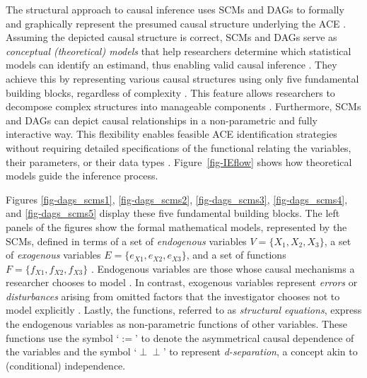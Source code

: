 \documentclass[
  authoryear,
  review,
  1p]{elsarticle}
\begin{document}
The structural approach to causal inference uses SCMs and DAGs to
formally and graphically represent the presumed causal structure
underlying the ACE
\citep{Pearl_2009, Pearl_et_al_2016, Gross_et_al_2018, Neal_2020}.
Assuming the depicted causal structure is correct, SCMs and DAGs serve
as \emph{conceptual (theoretical) models} that help researchers
determine which statistical models can identify an estimand, thus
enabling valid causal inference \citep{McElreath_2020}. They achieve
this by representing various causal structures using only five
fundamental building blocks, regardless of complexity
\citep{Neal_2020, McElreath_2020}. This feature allows researchers to
decompose complex structures into manageable components
\citep{McElreath_2020}. Furthermore, SCMs and DAGs can depict causal
relationships in a non-parametric and fully interactive way. This
flexibility enables feasible ACE identification strategies without
requiring detailed specifications of the functional relating the
variables, their parameters, or their data types
\citep{Pearl_et_al_2016}. Figure~\ref{fig-IEflow} shows how theoretical
models guide the inference process.

Figures \ref{fig-dags_scms1}, \ref{fig-dags_scms2},
\ref{fig-dags_scms3}, \ref{fig-dags_scms4}, and \ref{fig-dags_scms5}
display these five fundamental building blocks. The left panels of the
figures show the formal mathematical models, represented by the SCMs,
defined in terms of a set of \emph{endogenous} variables
\(V=\{X_{1},X_{2},X_{3}\}\), a set of \emph{exogenous} variables
\(E=\{e_{X1},e_{X2},e_{X3}\}\), and a set of functions
\(F=\{f_{X1},f_{X2},f_{X3}\}\) \citep{Pearl_2009, Cinelli_et_al_2020}.
Endogenous variables are those whose causal mechanisms a researcher
chooses to model \citep{Neal_2020}. In contrast, exogenous variables
represent \emph{errors} or \emph{disturbances} arising from omitted
factors that the investigator chooses not to model explicitly
\citep[pp.~27,68]{Pearl_2009}. Lastly, the functions, referred to as
\emph{structural equations}, express the endogenous variables as
non-parametric functions of other variables. These functions use the
symbol `\(:=\)' to denote the asymmetrical causal dependence of the
variables and the symbol `\(\perp\!\!\!\perp\)' to represent
\emph{d-separation}, a concept akin to (conditional) independence.
\end{document}
